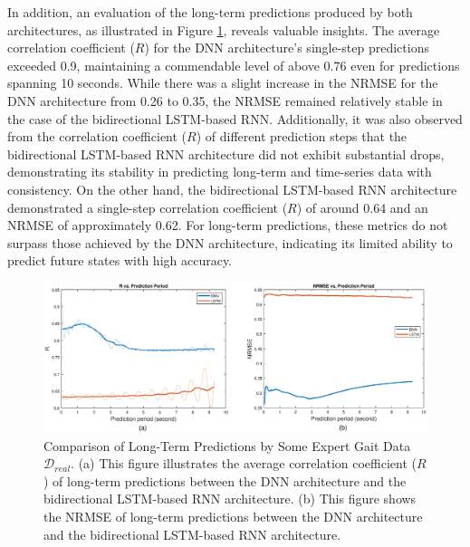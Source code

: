 In addition, an evaluation of the long-term predictions produced by both architectures, as illustrated in Figure \ref{fig:comp2net}, reveals valuable insights. The average correlation coefficient ($R$) for the DNN architecture's single-step predictions exceeded 0.9, maintaining a commendable level of above 0.76 even for predictions spanning 10 seconds. While there was a slight increase in the \ac{NRMSE} for the DNN architecture from 0.26 to 0.35, the \ac{NRMSE} remained relatively stable in the case of the bidirectional LSTM-based RNN. Additionally, it was also observed from the correlation coefficient ($R$) of different prediction steps that the bidirectional LSTM-based RNN architecture did not exhibit substantial drops, demonstrating its stability in predicting long-term and time-series data with consistency. On the other hand, the bidirectional LSTM-based RNN architecture demonstrated a single-step correlation coefficient ($R$) of around 0.64 and an \ac{NRMSE} of approximately 0.62. For long-term predictions, these metrics do not surpass those achieved by the DNN architecture, indicating its limited ability to predict future states with high accuracy. 
\begin{figure}[htb]
    \centering
    \includegraphics[width=\linewidth]{img/chap4/long2net.eps}
    \caption{Comparison of Long-Term Predictions by Some Expert Gait Data $\mathcal{D}_{real}$. (a) This figure illustrates the average correlation coefficient ($R$) of long-term predictions between the DNN architecture and the bidirectional LSTM-based RNN architecture. (b) This figure shows the \ac{NRMSE} of long-term predictions between the DNN architecture and the bidirectional LSTM-based RNN architecture.}
    \label{fig:comp2net}
\end{figure}

